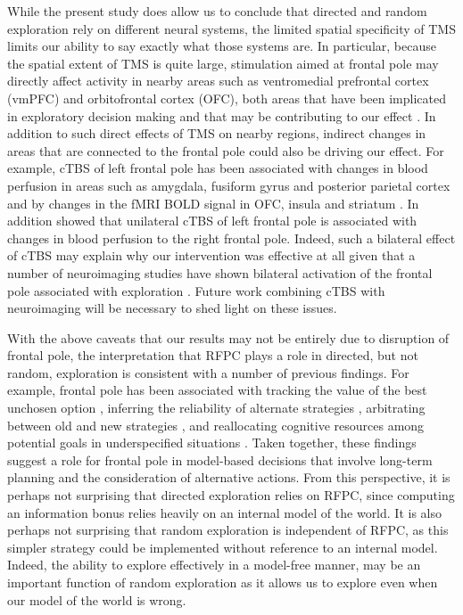 \documentclass[12pt]{article}
\begin{document}
While the present study does allow us to conclude that directed and random exploration rely on different neural systems, the limited spatial specificity of TMS limits our ability to say exactly what those systems are. In particular, because the spatial extent of TMS is quite large, stimulation aimed at frontal pole may directly affect activity in nearby areas such as ventromedial prefrontal cortex (vmPFC) and orbitofrontal cortex (OFC), both areas that have been implicated in exploratory decision making and that may be contributing to our effect \cite{Daw2006-vw}. In addition to such direct effects of TMS on nearby regions, indirect changes in areas that are connected to the frontal pole could also be driving our effect.  For example, cTBS of left frontal pole has been associated with changes in blood perfusion in areas such as amygdala, fusiform gyrus and posterior parietal cortex \cite{Volman2011-fz} and by changes in the fMRI BOLD signal in OFC, insula and striatum \cite{hanlon2017left}. In addition \cite{Volman2011-fz} showed that unilateral cTBS of left frontal pole is associated with changes in blood perfusion to the right frontal pole. Indeed, such a bilateral effect of cTBS may explain why our intervention was effective at all given that a number of neuroimaging studies have shown bilateral activation of the frontal pole associated with exploration \cite{Daw2006-vw,Badre2012-nt}. Future work combining cTBS with neuroimaging will be necessary to shed light on these issues.

With the above caveats that our results may not be entirely due to disruption of frontal pole, the interpretation that RFPC plays a role in directed, but not random, exploration is consistent with a number of previous findings.  For example, frontal pole has been associated with tracking the value of the best unchosen option \cite{Boorman2009-ns}, inferring the reliability of alternate strategies \cite{Boorman2009-ns,Domenech2015-nz}, arbitrating between old and new strategies \cite{Donoso2014-at,Mansouri2015-xa}, and reallocating cognitive resources among potential goals in underspecified situations \cite{Pollmann2016-lc}.  Taken together, these findings suggest a role for frontal pole in model-based decisions \cite{Daw2006-vw} that involve long-term planning and the consideration of alternative actions. From this perspective, it is perhaps not surprising that directed exploration relies on RFPC, since computing an information bonus relies heavily on an internal model of the world. It is also perhaps not surprising that random exploration is independent of RFPC, as this simpler strategy could be implemented without reference to an internal model. Indeed, the ability to explore effectively in a model-free manner, may be an important function of random exploration as it allows us to explore even when our model of the world is wrong.
\end{document}
